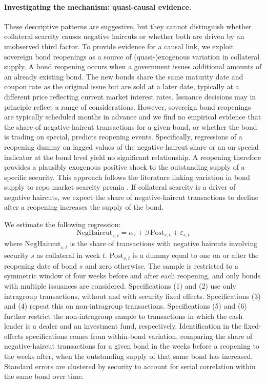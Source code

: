 \documentclass[english, 12pt, oneside]{article}
\begin{document}
\paragraph{Investigating the mechanism: quasi-causal evidence.}
These descriptive patterns are suggestive, but they cannot distinguish whether collateral scarcity causes negative haircuts or whether both are driven by an unobserved third factor. To provide evidence for a causal link, we exploit sovereign bond reopenings as a source of (quasi-)exogenous variation in collateral supply. A bond reopening occurs when a government issues additional amounts of an already existing bond. The new bonds share the same maturity date and coupon rate as the original issue but are sold at a later date, typically at a different price reflecting current market interest rates. Issuance decisions may in principle reflect a range of considerations. However, sovereign bond reopenings are typically scheduled months in advance and we find no empirical evidence that the share of negative-haircut transactions for a given bond, or whether the bond is trading on special, predicts reopening events. Specifically, regressions of a reopening dummy on lagged values of the negative-haircut share or an on-special indicator at the bond level yield no significant relationship. A reopening therefore provides a plausibly exogenous positive shock to the outstanding supply of a specific security. This approach follows the literature linking variation in bond supply to repo market scarcity premia \citep{corradin2020}. If collateral scarcity is a driver of negative haircuts, we expect the share of negative-haircut transactions to decline after a reopening increases the supply of the bond.

We estimate the following regression:
\begin{equation}
    \text{NegHaircut}_{s,t} = \alpha_s + \beta \, \text{Post}_{s,t} + \varepsilon_{s,t}
\end{equation}
where $\text{NegHaircut}_{s,t}$ is the share of transactions with negative haircuts involving security $s$ as collateral in week $t$. $\text{Post}_{s,t}$ is a dummy equal to one on or after the reopening date of bond $s$ and zero otherwise. The sample is restricted to a symmetric window of four weeks before and after each reopening, and only bonds with multiple issuances are considered.  Specifications (1) and (2) use only intragroup transactions, without and with security fixed effects. Specifications (3) and (4) repeat this on non-intragroup transactions. Specifications (5) and (6) further restrict the non-intragroup sample to transactions in which the cash lender is a dealer and an investment fund, respectively. Identification in the fixed-effects specifications comes from within-bond variation, comparing the share of negative-haircut transactions for a given bond in the weeks before a reopening to the weeks after, when the outstanding supply of that same bond has increased. Standard errors are clustered by security to account for serial correlation within the same bond over time.
\end{document}
